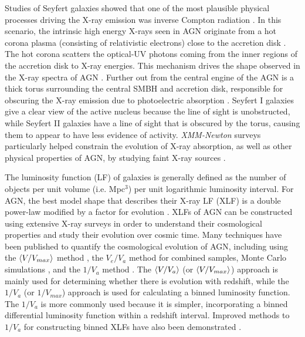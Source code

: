 \documentclass[fleqn,usenatbib]{mnras}
\begin{document}
Studies of Seyfert galaxies showed that one of the most plausible physical processes driving the X-ray emission was inverse Compton radiation \citep{haardt1991two}. 
In this scenario, the intrinsic high energy X-rays seen in AGN originate from a hot corona plasma (consisting of relativistic electrons) close to the accretion disk \citep{beckmann2013active}. 
The hot corona scatters the optical-UV photons coming from the inner regions of the accretion disk to X-ray energies. 
This mechanism drives the shape observed in the X-ray spectra of AGN \citep{netzer2013physics}. 
Further out from the central engine of the AGN is a thick torus surrounding the central SMBH and accretion disk, responsible for obscuring the X-ray emission due to photoelectric absorption \citep{morrison1983photoelectric, antonucci1993unified}. 
Seyfert I galaxies give a clear view of the active nucleus because the line of sight is unobstructed, while Seyfert II galaxies have a line of sight that is obscured by the torus, causing them to appear to have less evidence of activity. 
\textit{XMM-Newton} surveys particularly helped constrain the evolution of X-ray absorption, as well as other physical properties of AGN, by studying faint X-ray sources \citep{hasinger2001xmm}. 

The luminosity function (LF) of galaxies is generally defined as the number of objects per unit volume (i.e. Mpc$^3$) per unit logarithmic luminosity interval. 
For AGN, the best model shape that describes their X-ray LF (XLF) is a double power-law modified by a factor for evolution \citep[e.g.][]{boyle1988qsoevolution,miyaji2000rosatxlf}.
XLFs of AGN can be constructed using extensive X-ray surveys in order to understand their cosmological properties and study their evolution over cosmic time. 
Many techniques have been published to quantify the cosmological evolution of AGN, including using the $\braket{V/V_{max}}$ method \citep{schmidt1968space},
the $V_{e}/V_{a}$ method \citep{avni1979simultaneous} for combined samples,
Monte Carlo simulations \citep{cristiani1990composite}, 
and the $1/V_{a}$ method \citep{maccacaro1991properties}.
The $\braket{V/V_{a}}$ (or $\braket{V/V_{max}}$) approach is mainly used for determining whether there is evolution with redshift, while the $1/V_{a}$ (or $1/V_{max}$) approach is used for calculating a binned luminosity function.
The $1/V_{a}$ is more commonly used because it is simpler, incorporating a binned differential luminosity function within a redshift interval. 
Improved methods to $1/V_{a}$ for constructing binned XLFs have also been demonstrated \citep{page2000improved, cara2008method}.
\end{document}
